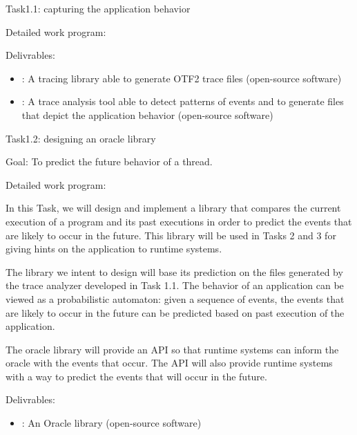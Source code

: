 \documentclass[a4paper,11pt,defblank]{article}
\begin{document}
\begin{paragraph}{Task1.1: capturing the application behavior}
\begin{paragraph}{Detailed work program:}
\end{paragraph}

\begin{paragraph}{Delivrables:}
  \begin{itemize}
  \item[T0+6] [D1.1]: A tracing library able to generate OTF2 trace files (open-source software)
  \item[T0+15] [D1.2]: A trace analysis tool able to detect patterns
    of events and to generate files that depict the application
    behavior (open-source software)
  \end{itemize}
\end{paragraph}

\end{paragraph}                 %


\begin{paragraph}{Task1.2: designing an oracle library}

\begin{paragraph}{Goal:}
  To predict the future behavior of a thread.
\end{paragraph}

\begin{paragraph}{Detailed work program:}

  In this Task, we will design and implement a library that compares
  the current execution of a program and its past executions in order
  to predict the events that are likely to occur in the future. This
  library will be used in Tasks 2 and 3 for giving hints on the
  application to runtime systems.

  The library we intent to design will base its prediction on the
  files generated by the trace analyzer developed in Task 1.1. The
  behavior of an application can be viewed as a probabilistic automaton:
  given a sequence of events, the events that are likely to occur in
  the future can be predicted based on past execution of the
  application.

  The oracle library will provide an API so that runtime systems can
  inform the oracle with the events that occur. The API will also
  provide runtime systems with a way to predict the events that will
  occur in the future.

\end{paragraph}

\begin{paragraph}{Delivrables:}
  \begin{itemize}
  \item[T0+18] [D1.3]: An Oracle library (open-source software)
  \end{itemize}
\end{paragraph}

\end{paragraph}                 %
\end{document}
